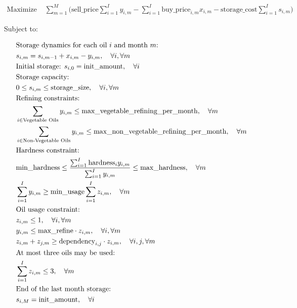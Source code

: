 \documentclass{article}
\begin{document}
\begin{align*}
\text{Maximize } & \sum_{m=1}^{M} \Bigg( \text{sell\_price} \sum_{i=1}^{I} y_{i,m} - \sum_{i=1}^{I} \text{buy\_price}_{i,m} x_{i,m} - \text{storage\_cost} \sum_{i=1}^{I} s_{i,m} \Bigg)
\end{align*}

Subject to:

\begin{align*}
& \text{Storage dynamics for each oil \( i \) and month \( m \):} \\
& s_{i,m} = s_{i,m-1} + x_{i,m} - y_{i,m}, \quad \forall i, \forall m \\
& \text{Initial storage: } s_{i,0} = \text{init\_amount}, \quad \forall i \\

& \text{Storage capacity:} \\
& 0 \leq s_{i,m} \leq \text{storage\_size}, \quad \forall i, \forall m \\

& \text{Refining constraints:} \\
& \sum_{i \in \text{Vegetable Oils}} y_{i,m} \leq \text{max\_vegetable\_refining\_per\_month}, \quad \forall m \\
& \sum_{i \in \text{Non-Vegetable Oils}} y_{i,m} \leq \text{max\_non\_vegetable\_refining\_per\_month}, \quad \forall m \\

& \text{Hardness constraint:} \\
& \text{min\_hardness} \leq \frac{\sum_{i=1}^{I} \text{hardness}_{i} y_{i,m}}{\sum_{i=1}^{I} y_{i,m}} \leq \text{max\_hardness}, \quad \forall m \\
& \sum_{i=1}^{I} y_{i,m} \geq \text{min\_usage} \sum_{i=1}^{I} z_{i,m}, \quad \forall m \\

& \text{Oil usage constraint:} \\
& z_{i,m} \leq 1, \quad \forall i, \forall m \\
& y_{i,m} \leq \text{max\_refine} \cdot z_{i,m}, \quad \forall i, \forall m \\
& z_{i,m} + z_{j,m} \geq \text{dependency}_{i,j} \cdot z_{i,m}, \quad \forall i, j, \forall m \\

& \text{At most three oils may be used:} \\
& \sum_{i=1}^{I} z_{i,m} \leq 3, \quad \forall m \\

& \text{End of the last month storage:} \\
& s_{i,M} = \text{init\_amount}, \quad \forall i \\
\end{align*}
\end{document}
